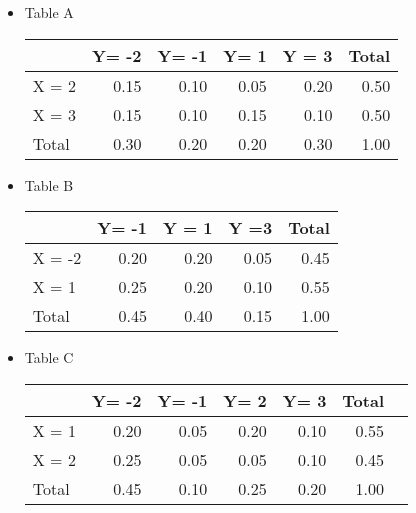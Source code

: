 \documentclass[]{article}
\begin{document}
\begin{itemize}

\item Table A
\begin{table}[ht]
\centering
\begin{tabular}{|l||r|r|r|r||r|}
  \hline
 & Y= -2 & Y= -1 & Y=  1 & Y = 3 & Total \\ 
  \hline
X = 2 & 0.15 & 0.10 & 0.05 & 0.20 & 0.50 \\ \hline
X = 3 & 0.15 & 0.10 & 0.15 & 0.10 & 0.50 \\ \hline
  Total & 0.30 & 0.20 & 0.20 & 0.30 & 1.00 \\ 
   \hline
\end{tabular}
\end{table}


\item Table B
\begin{table}[ht]
\centering
\begin{tabular}{|l||r|r|r||r|}
  \hline
 & Y= -1 & Y = 1 & Y =3 & Total \\ 
  \hline
X = -2 & 0.20 & 0.20 & 0.05 & 0.45 \\ \hline
X = 1 & 0.25 & 0.20 & 0.10 & 0.55 \\ \hline
  Total & 0.45 & 0.40 & 0.15 & 1.00 \\ 
   \hline
\end{tabular}
\end{table}

\item Table C
\begin{table}[ht]
\centering
\begin{tabular}{|l||r|r|r|r|r||r|}
  \hline
 & Y= -2 & Y= -1 & Y= 2 & Y= 3 & Total \\ 
  \hline
X = 1 & 0.20 & 0.05 & 0.20 & 0.10 & 0.55 \\ \hline
X = 2 & 0.25 & 0.05 & 0.05 & 0.10 & 0.45 \\ \hline
  Total & 0.45 & 0.10 & 0.25 & 0.20 & 1.00 \\ 
   \hline
\end{tabular}
\end{table}
\end{itemize}
\end{document}
